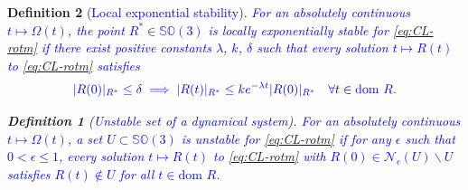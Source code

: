 \documentclass{article}
\newcommand{\dom}{\text{dom }}
\newcommand{\SOthree}{\mathbb{SO}(3)}
\newtheorem{definition}{Definition}
\newcommand{\textblue}[1]{\textcolor{blue}{#1}}
\newcommand{\Rtilde}{\tilde{R}}
\newcommand{\normSOthree}[1]{{{\vert}#1 {\vert}_I}}
\newcommand{\expo}[1]{e^{#1}}
\newcommand{\Rstar}{{R^*}}
\newcommand{\neighbourhood}[2]{\mathcal{N}_{#1}(#2)}
\begin{document}
\begin{definition}[\textblue{Local exponential stability}]\label{def:local_lyap_stab}
\textblue{For an absolutely continuous $t\mapsto\Omega(t)$, the point $\Rstar\in\SOthree$ is locally exponentially stable {for \eqref{eq:CL-rotm}} if there exist positive constants $\lambda$, $k$, $\delta$ such that every solution $t\mapsto R(t)$ {to \eqref{eq:CL-rotm}} satisfies}
\begin{align*}
    \textblue{|R(0)|_{\Rstar}\leq \delta \implies |R(t)|_{\Rstar} \leq  k\expo{-\lambda t} |R(0)|_{\Rstar} \quad \forall t \in \dom R.}
\end{align*}

    

\begin{definition}[\textblue{Unstable set of a dynamical system}] \textblue{For an absolutely continuous $t\mapsto \Omega(t)$, a set $U\subset \SOthree$ is unstable for \eqref{eq:CL-rotm} if for any $\epsilon$ such that $0 < \epsilon \leq 1$, every solution $t\mapsto R(t)$ to \eqref{eq:CL-rotm} with $R(0) \in \neighbourhood{\epsilon}{U}\backslash U$ satisfies $R(t)\notin U$ for all $t\in \dom R$.  }
    
\end{definition}




\end{definition}

\end{document}

